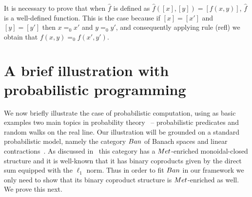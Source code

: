 \documentclass[a4paper,UKenglish,cleveref, autoref, thm-restate]{lipics-v2021}
\begin{document}


It is necessary to prove that when $\hat{f}$ is defined as $\hat{f}([x],[y]) = [f(x,y)]$, $\hat{f}$ is a well-defined function. This is the case because if $[x] = [x']$ and $[y] = [y']$ then $x =_0 x'$ and $y =_0 y'$, and consequently applying rule  (refl) we obtain that $f(x,y) =_0 f(x',y')$.


\section{A brief illustration with probabilistic programming}

We now briefly illustrate the case of probabilistic computation, using as basic
examples two main topics in probability theory~\cite{dudley18} -- probabilistic
predicates and random walks on the real line.  Our illustration will be
grounded on a standard probabilistic model, namely the category $\Ban$ of
Banach spaces and linear contractions~\cite{dahlqvist19}. As discussed
in~\cite{dahlqvist2023syntactic} this category has a $\Met$-enriched
monoidal-closed structure and it is well-known that it has binary coproducts
given by the direct sum equipped with the $\ell_1$ norm. Thus in order to fit
$\Ban$ in our framework we only need to show that its binary coproduct
structure is $\Met$-enriched as well. We prove this next. 
\end{document}
